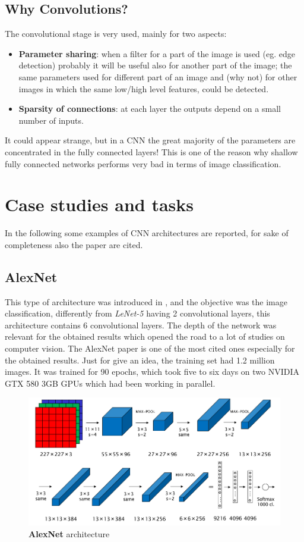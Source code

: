 \subsection{Why Convolutions?}
The convolutional stage is very used, mainly for two aspects: 
\begin{itemize}
    \itemsep-0.3em 
    \item \textbf{Parameter sharing}: when a filter for a part of the image is used (eg. edge detection) probably it will be useful also for another part of the image; the same parameters used for different part of an image and (why not) for other images in which the same low/high level features, could be detected.
    \item \textbf{Sparsity of connections}: at each layer the outputs depend on a small number of inputs.
\end{itemize}
It could appear strange, but in a CNN the great majority of the parameters are concentrated in the fully connected layers! This is one of the reason why shallow fully connected networks performs very bad in terms of image classification.

\section{Case studies and tasks}
In the following some examples of CNN architectures are reported, for sake of completeness also the paper are cited.

\subsection{AlexNet}
This type of architecture was introduced in \cite{AlexNet}, and the objective was the image classification, differently from \textit{LeNet-5} having 2 convolutional layers, this architecture contains 6 convolutional layers. The depth of the network was relevant for the obtained results which opened the road to a lot of studies on computer vision. The AlexNet paper is one of the most cited ones especially for the obtained results. Just for give an idea, the training set had 1.2 million images. It was trained for 90 epochs, which took five to six days on two NVIDIA GTX 580 3GB GPUs which had been working in parallel. 

\begin{figure}[h]
    \centering
    \includegraphics[scale=0.6]{img/AlexNet.png}
    \caption{\textbf{AlexNet} architecture}
\end{figure}

